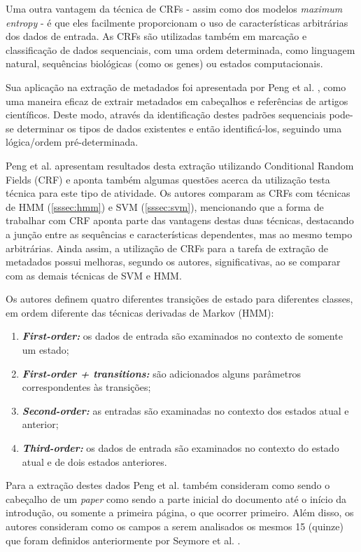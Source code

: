 Uma outra vantagem da técnica de CRFs - assim como dos modelos \emph{maximum entropy} - é que eles facilmente proporcionam o uso de características arbitrárias dos dados de entrada. As CRFs são utilizadas também em marcação e classificação de dados sequenciais, com uma ordem determinada, como linguagem natural, sequências biológicas (como os genes) ou estados computacionais.


Sua aplicação na extração de metadados foi apresentada por Peng et al. \cite{Peng-CRF-IE}, como uma maneira eficaz de extrair metadados em cabeçalhos e referências de artigos científicos. Deste modo, através da identificação destes padrões sequenciais pode-se determinar os tipos de dados existentes e então identificá-los, seguindo uma lógica/ordem pré-determinada.

Peng et al. apresentam resultados desta extração utilizando Conditional Random Fields (CRF) e aponta também algumas questões acerca da utilização testa técnica para este tipo de atividade. Os autores comparam as CRFs com técnicas de HMM (\autoref{sssec:hmm}) e SVM (\autoref{sssec:svm}), mencionando que a forma de trabalhar com CRF aponta parte das vantagens destas duas técnicas, destacando a junção entre as sequências e características dependentes, mas ao mesmo tempo arbitrárias. Ainda assim, a utilização de CRFs para a tarefa de extração de metadados possui melhoras, segundo os autores, significativas, ao se comparar com as demais técnicas de SVM e HMM.

Os autores definem quatro diferentes transições de estado para diferentes classes, em ordem diferente das técnicas derivadas de Markov (HMM):

\begin{enumerate}
    \item \emph{\textbf{First-order:}} os dados de entrada são examinados no contexto de somente um estado;
    \item \emph{\textbf{First-order + transitions:}} são adicionados alguns parâmetros correspondentes às transições;
    \item \emph{\textbf{Second-order:}} as entradas são examinadas no contexto dos estados atual e anterior;
    \item \emph{\textbf{Third-order:}} os dados de entrada são examinados no contexto do estado atual e de dois estados anteriores.
\end{enumerate}

Para a extração destes dados Peng et al. também consideram como sendo o cabeçalho de um \emph{paper} como sendo a parte inicial do documento até o início da introdução, ou somente a primeira página, o que ocorrer primeiro. Além disso, os autores consideram como os campos a serem analisados os mesmos 15 (quinze) que foram definidos anteriormente por Seymore et al. \cite{Seymore-HMM-IE}.

